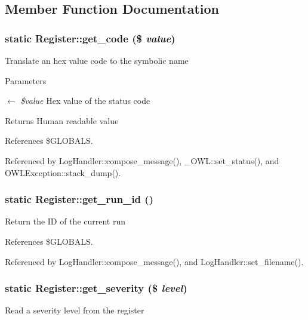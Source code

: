 \subsection{Member Function Documentation}
\subsubsection[{get\_\-code}]{\setlength{\rightskip}{0pt plus 5cm}static Register::get\_\-code (\$ {\em value})}\label{classRegister_a363389530273f40c3b20666bbff75e05}
Translate an hex value code to the symbolic name


\begin{DoxyParams}{Parameters}
\item[\mbox{$\leftarrow$} {\em \$value}]Hex value of the status code \end{DoxyParams}
\begin{DoxyReturn}{Returns}
Human readable value 
\end{DoxyReturn}


References \$GLOBALS.



Referenced by LogHandler::compose\_\-message(), \_\-OWL::set\_\-status(), and OWLException::stack\_\-dump().

\subsubsection[{get\_\-run\_\-id}]{\setlength{\rightskip}{0pt plus 5cm}static Register::get\_\-run\_\-id ()}\label{classRegister_a041706fafb409a31f125d2075501e82e}
Return the ID of the current run 

References \$GLOBALS.



Referenced by LogHandler::compose\_\-message(), and LogHandler::set\_\-filename().

\subsubsection[{get\_\-severity}]{\setlength{\rightskip}{0pt plus 5cm}static Register::get\_\-severity (\$ {\em level})}\label{classRegister_ae71e10bddb03483b54ad22b9edb95b7c}
Read a severity level from the register


